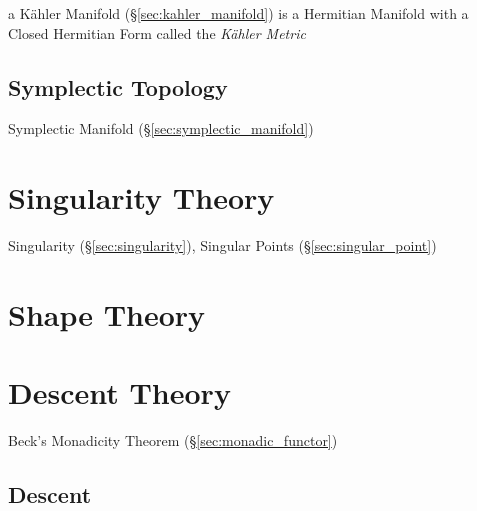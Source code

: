 a K\"ahler Manifold (\S\ref{sec:kahler_manifold}) is a Hermitian
Manifold with a Closed Hermitian Form called the \emph{K\"ahler
  Metric} %



\subsection{Symplectic Topology}\label{sec:symplectic_topology}

Symplectic Manifold (\S\ref{sec:symplectic_manifold})



\section{Singularity Theory}\label{sec:singularity_theory}

\fist Singularity (\S\ref{sec:singularity}), Singular Points
(\S\ref{sec:singular_point})



\section{Shape Theory}\label{sec:shape_theory}

\section{Descent Theory}\label{sec:descent_theory}

Beck's Monadicity Theorem (\S\ref{sec:monadic_functor})



\subsection{Descent}\label{sec:descent}

